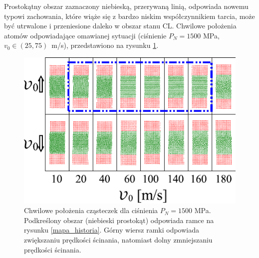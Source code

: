 \documentclass[12pt,a4paper,openright]{report} %
\begin{document}
Prostokątny obszar zaznaczony niebieską, przerywaną linią, odpowiada nowemu typowi zachowania, które wiąże się z bardzo niskim współczynnikiem tarcia, może być utrwalone i przeniesione daleko w obszar stanu CL. Chwilowe położenia atomów odpowiadające omawianej sytuacji (ciśnienie $P_N=1500$ MPa, $v_0 \in (25, 75)$~m/s), przedstawiono na rysunku \ref{historia_stany}. 
\begin{figure}[h]
\centering
\includegraphics[width=135mm]{rysunki/PRE16_fig12.pdf}
\caption{Chwilowe położenia cząsteczek dla ciśnienia $P_N=1500$ MPa. Podkreślony obszar (niebieski prostokąt) odpowiada ramce na rysunku \ref{mapa_historia}. Górny wiersz ramki odpowiada zwiększaniu prędkości ścinania, natomiast dolny zmniejszaniu prędkości ścinania.}
\label{historia_stany}
\end{figure}
\end{document}
